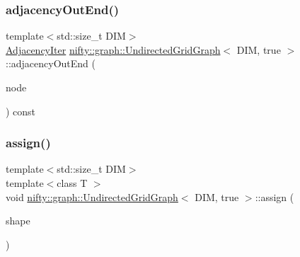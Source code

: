 \mbox{\label{classnifty_1_1graph_1_1UndirectedGridGraph_3_01DIM_00_01true_01_4_a0f11853661461e518fecbf8a18ed9a07}} 
\subsubsection{\texorpdfstring{adjacency\+Out\+End()}{adjacencyOutEnd()}}
{\footnotesize\ttfamily template$<$std\+::size\+\_\+t D\+IM$>$ \\
\hyperlink{classnifty_1_1graph_1_1UndirectedGridGraph_3_01DIM_00_01true_01_4_a9779969eb8762908d43eab3d9d3b17b1}{Adjacency\+Iter} \hyperlink{classnifty_1_1graph_1_1UndirectedGridGraph}{nifty\+::graph\+::\+Undirected\+Grid\+Graph}$<$ D\+IM, true $>$\+::adjacency\+Out\+End (\begin{DoxyParamCaption}\item[{const int64\+\_\+t}]{node }\end{DoxyParamCaption}) const\hspace{0.3cm}{\ttfamily [inline]}}

\mbox{\label{classnifty_1_1graph_1_1UndirectedGridGraph_3_01DIM_00_01true_01_4_ad966a5e524bba56b8096c999d41bfeae}} 
\subsubsection{\texorpdfstring{assign()}{assign()}}
{\footnotesize\ttfamily template$<$std\+::size\+\_\+t D\+IM$>$ \\
template$<$class T $>$ \\
void \hyperlink{classnifty_1_1graph_1_1UndirectedGridGraph}{nifty\+::graph\+::\+Undirected\+Grid\+Graph}$<$ D\+IM, true $>$\+::assign (\begin{DoxyParamCaption}\item[{const \hyperlink{namespacenifty_1_1array_a683f151f19c851754e0c6d55ed16a0c2}{nifty\+::array\+::\+Static\+Array}$<$ T, D\+IM $>$ \&}]{shape }\end{DoxyParamCaption})\hspace{0.3cm}{\ttfamily [inline]}}

